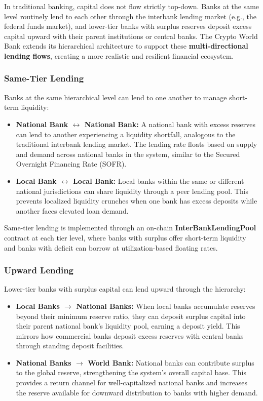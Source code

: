 \documentclass[12pt,a4paper]{report}
\begin{document}
In traditional banking, capital does not flow strictly top-down. Banks at the same level routinely lend to each other through the interbank lending market (e.g., the federal funds market), and lower-tier banks with surplus reserves deposit excess capital upward with their parent institutions or central banks. The Crypto World Bank extends its hierarchical architecture to support these \textbf{multi-directional lending flows}, creating a more realistic and resilient financial ecosystem.

\subsubsection{Same-Tier Lending}

Banks at the same hierarchical level can lend to one another to manage short-term liquidity:

\begin{itemize}[noitemsep]
\item \textbf{National Bank $\leftrightarrow$ National Bank:} A national bank with excess reserves can lend to another experiencing a liquidity shortfall, analogous to the traditional interbank lending market. The lending rate floats based on supply and demand across national banks in the system, similar to the Secured Overnight Financing Rate (SOFR).
\item \textbf{Local Bank $\leftrightarrow$ Local Bank:} Local banks within the same or different national jurisdictions can share liquidity through a peer lending pool. This prevents localized liquidity crunches when one bank has excess deposits while another faces elevated loan demand.
\end{itemize}

Same-tier lending is implemented through an on-chain \textbf{InterBankLendingPool} contract at each tier level, where banks with surplus offer short-term liquidity and banks with deficit can borrow at utilization-based floating rates.

\subsubsection{Upward Lending}

Lower-tier banks with surplus capital can lend upward through the hierarchy:

\begin{itemize}[noitemsep]
\item \textbf{Local Banks $\to$ National Banks:} When local banks accumulate reserves beyond their minimum reserve ratio, they can deposit surplus capital into their parent national bank's liquidity pool, earning a deposit yield. This mirrors how commercial banks deposit excess reserves with central banks through standing deposit facilities.
\item \textbf{National Banks $\to$ World Bank:} National banks can contribute surplus to the global reserve, strengthening the system's overall capital base. This provides a return channel for well-capitalized national banks and increases the reserve available for downward distribution to banks with higher demand.
\end{itemize}
\end{document}
